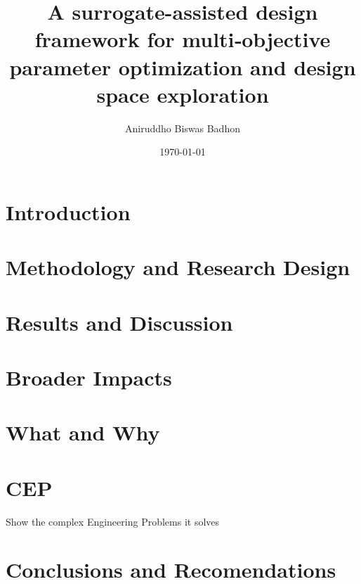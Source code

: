 \documentclass[12pt,a4paper]{report}
\title{\textbf{A surrogate-assisted design framework for multi‑objective parameter optimization and design space exploration}}
\author{Aniruddho Biswas Badhon}
\date{\today}
\begin{document}
\maketitle

\begin{abstract}
    \textit{}
\end{abstract}

\tableofcontents
\listoffigures
\listoftables

\chapter{Introduction}
\chapter{Methodology and Research Design}
\chapter{Results and Discussion}
\chapter{Broader Impacts}
\chapter{What and Why}
\chapter{CEP}
Show the complex Engineering Problems it solves

\chapter{Conclusions and Recomendations}


\end{document}
